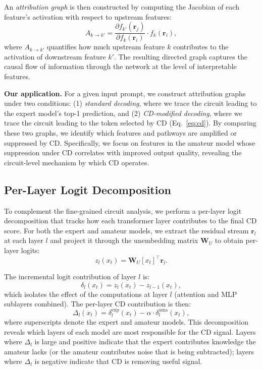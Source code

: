 \documentclass[11pt]{article}
\begin{document}
An \emph{attribution graph} is then constructed by computing the Jacobian of each feature's activation with respect to upstream features:
\begin{equation}
\label{eq:attribution}
A_{k \to k'} = \frac{\partial f_{k'}(\mathbf{r}_j)}{\partial f_k(\mathbf{r}_i)} \cdot f_k(\mathbf{r}_i),
\end{equation}
where $A_{k \to k'}$ quantifies how much upstream feature $k$ contributes to the activation of downstream feature $k'$. The resulting directed graph captures the causal flow of information through the network at the level of interpretable features.

\textbf{Our application.} For a given input prompt, we construct attribution graphs under two conditions: (1) \emph{standard decoding}, where we trace the circuit leading to the expert model's top-1 prediction, and (2) \emph{CD-modified decoding}, where we trace the circuit leading to the token selected by CD (Eq.~\ref{eq:cd}). By comparing these two graphs, we identify which features and pathways are amplified or suppressed by CD. Specifically, we focus on features in the amateur model whose suppression under CD correlates with improved output quality, revealing the circuit-level mechanism by which CD operates.

\subsection{Per-Layer Logit Decomposition}
\label{sec:logit-decomp}

To complement the fine-grained circuit analysis, we perform a per-layer logit decomposition that tracks how each transformer layer contributes to the final CD score. For both the expert and amateur models, we extract the residual stream $\mathbf{r}_l$ at each layer $l$ and project it through the unembedding matrix $\mathbf{W}_U$ to obtain per-layer logits:
\begin{equation}
\label{eq:layer-logit}
z_l(x_t) = \mathbf{W}_U[x_t]^\top \mathbf{r}_l.
\end{equation}

The incremental logit contribution of layer $l$ is:
\begin{equation}
\label{eq:layer-contrib}
\delta_l(x_t) = z_l(x_t) - z_{l-1}(x_t),
\end{equation}
which isolates the effect of the computations at layer $l$ (attention and MLP sublayers combined). The per-layer CD contribution is then:
\begin{equation}
\label{eq:cd-layer}
\Delta_l(x_t) = \delta_l^{\text{exp}}(x_t) - \alpha \cdot \delta_l^{\text{ama}}(x_t),
\end{equation}
where superscripts denote the expert and amateur models. This decomposition reveals which layers of each model are most responsible for the CD signal. Layers where $\Delta_l$ is large and positive indicate that the expert contributes knowledge the amateur lacks (or the amateur contributes noise that is being subtracted); layers where $\Delta_l$ is negative indicate that CD is removing useful signal.
\end{document}
